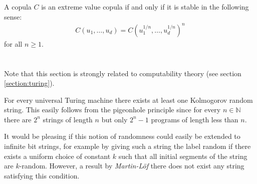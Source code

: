     \begin{property}
        A copula $C$ is an extreme value copula if and only if it is stable in the following sense:
        \begin{gather}
            C(u_1,\ldots,u_d) = C(u_1^{1/n},\ldots,u_d^{1/n})^n
        \end{gather}
        for all $n\geq1$.
    \end{property}

\section{}

    Note that this section is strongly related to computability theory (see section \ref{section:turing}).


    \begin{property}
        For every universal Turing machine there exists at least one Kolmogorov random string. This easily follows from the pigeonhole principle since for every $n\in\mathbb{N}$ there are $2^n$ strings of length $n$ but only $2^n-1$ programs of length less than $n$.
    \end{property}

    It would be pleasing if this notion of randomness could easily be extended to infinite bit strings, for example by giving such a string the label random if there exists a uniform choice of constant $k$ such that all initial segments of the string are $k$-random. However, a result by \textit{Martin-L\"of} there does not exist any string satisfying this condition.
